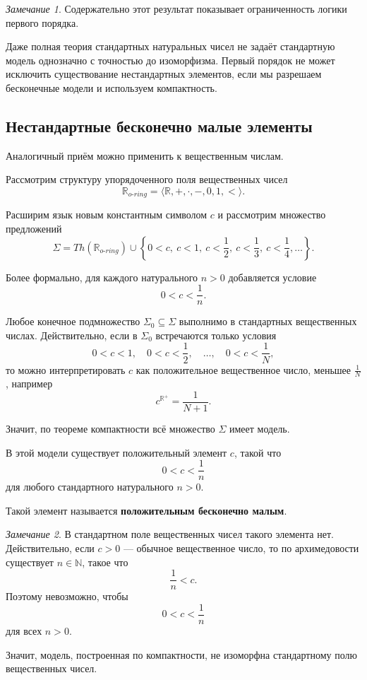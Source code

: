 \documentclass[12pt,a4paper,oneside,openany]{book}
\theoremstyle{definition}
\theoremstyle{plain}
\theoremstyle{remark}
\newtheorem{remark}{Замечание}[chapter]
\begin{document}
\begin{remark}
Содержательно этот результат показывает ограниченность логики первого порядка.

Даже полная теория стандартных натуральных чисел не задаёт стандартную модель однозначно с точностью до изоморфизма. Первый порядок не может исключить существование нестандартных элементов, если мы разрешаем бесконечные модели и используем компактность.
\end{remark}

\subsection{Нестандартные бесконечно малые элементы}

Аналогичный приём можно применить к вещественным числам.

Рассмотрим структуру упорядоченного поля вещественных чисел
\[
\mathbb R_{o\text{-}ring}
=
\langle\mathbb R,+,\cdot,-,0,1,<\rangle.
\]

Расширим язык новым константным символом $c$ и рассмотрим множество предложений
\[
\Sigma
=
Th(\mathbb R_{o\text{-}ring})
\cup
\left\{
0<c,\ 
c<1,\ 
c<\frac12,\ 
c<\frac13,\ 
c<\frac14,\ldots
\right\}.
\]

Более формально, для каждого натурального $n>0$ добавляется условие
\[
0<c<\frac1n.
\]

Любое конечное подмножество $\Sigma_0\subseteq\Sigma$ выполнимо в стандартных вещественных числах. Действительно, если в $\Sigma_0$ встречаются только условия
\[
0<c<1,\quad 0<c<\frac12,\quad \ldots,\quad 0<c<\frac1N,
\]
то можно интерпретировать $c$ как положительное вещественное число, меньшее $\frac1N$, например
\[
c^{\mathbb R^+}=\frac1{N+1}.
\]

Значит, по теореме компактности всё множество $\Sigma$ имеет модель.

В этой модели существует положительный элемент $c$, такой что
\[
0<c<\frac1n
\]
для любого стандартного натурального $n>0$.

Такой элемент называется \textbf{положительным бесконечно малым}.

\begin{remark}
В стандартном поле вещественных чисел такого элемента нет. Действительно, если $c>0$ — обычное вещественное число, то по архимедовости существует $n\in\mathbb N$, такое что
\[
\frac1n<c.
\]
Поэтому невозможно, чтобы
\[
0<c<\frac1n
\]
для всех $n>0$.

Значит, модель, построенная по компактности, не изоморфна стандартному полю вещественных чисел.
\end{remark}
\end{document}
